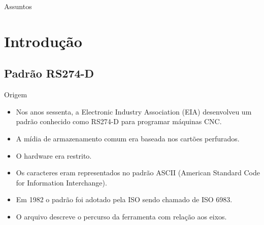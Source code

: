 \documentclass[aspectratio=169]{beamer}
\begin{document}
{%
\begin{frame}{Assuntos}
  \tableofcontents
\end{frame}


\section{Introdução}

\subsection{Padrão RS274-D}

\begin{frame}{Origem}
  \begin{itemize}
  \item {
    Nos anos sessenta, a Electronic Industry Association (EIA) desenvolveu um 
    padrão conhecido como RS274-D para programar máquinas CNC.
  }
  \item {
    A mídia de armazenamento comum era baseada nos cartões perfurados.
  }
  \item {
    O hardware era restrito.
  }
  \item {
    Os caracteres eram representados no padrão ASCII (American Standard Code for Information Interchange).
  }
  \item {
    Em 1982 o padrão foi adotado pela ISO sendo chamado de ISO 6983.
  }
  \item {
    O arquivo descreve o percurso da ferramenta com relação aos eixos.
  }
  \end{itemize}
\end{frame}

}
\end{document}
